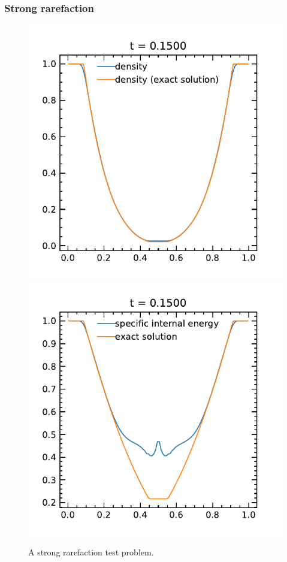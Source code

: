 \documentclass[fleqn,usenatbib]{mnras}
\begin{document}
\subsubsection{Strong rarefaction}
\begin{figure}
    \includegraphics[width=\columnwidth]{hydro_vacuum_0.1500.pdf}
    \includegraphics[width=\columnwidth]{hydro_vacuum_eint_0.1500.pdf}
    \caption{A strong rarefaction test problem.}
    \label{fig:vacuum}
\end{figure}
\end{document}

